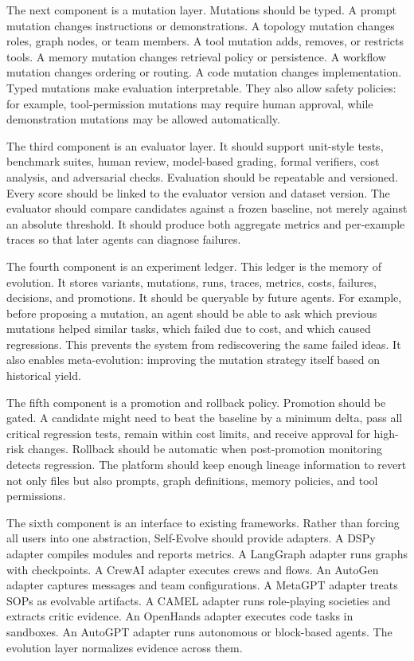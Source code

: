 The next component is a mutation layer.  Mutations should be typed.  A prompt mutation changes instructions or demonstrations.  A topology mutation changes roles, graph nodes, or team members.  A tool mutation adds, removes, or restricts tools.  A memory mutation changes retrieval policy or persistence.  A workflow mutation changes ordering or routing.  A code mutation changes implementation.  Typed mutations make evaluation interpretable.  They also allow safety policies: for example, tool-permission mutations may require human approval, while demonstration mutations may be allowed automatically.

The third component is an evaluator layer.  It should support unit-style tests, benchmark suites, human review, model-based grading, formal verifiers, cost analysis, and adversarial checks.  Evaluation should be repeatable and versioned.  Every score should be linked to the evaluator version and dataset version.  The evaluator should compare candidates against a frozen baseline, not merely against an absolute threshold.  It should produce both aggregate metrics and per-example traces so that later agents can diagnose failures.

The fourth component is an experiment ledger.  This ledger is the memory of evolution.  It stores variants, mutations, runs, traces, metrics, costs, failures, decisions, and promotions.  It should be queryable by future agents.  For example, before proposing a mutation, an agent should be able to ask which previous mutations helped similar tasks, which failed due to cost, and which caused regressions.  This prevents the system from rediscovering the same failed ideas.  It also enables meta-evolution: improving the mutation strategy itself based on historical yield.

The fifth component is a promotion and rollback policy.  Promotion should be gated.  A candidate might need to beat the baseline by a minimum delta, pass all critical regression tests, remain within cost limits, and receive approval for high-risk changes.  Rollback should be automatic when post-promotion monitoring detects regression.  The platform should keep enough lineage information to revert not only files but also prompts, graph definitions, memory policies, and tool permissions.

The sixth component is an interface to existing frameworks.  Rather than forcing all users into one abstraction, Self-Evolve should provide adapters.  A DSPy adapter compiles modules and reports metrics.  A LangGraph adapter runs graphs with checkpoints.  A CrewAI adapter executes crews and flows.  An AutoGen adapter captures messages and team configurations.  A MetaGPT adapter treats SOPs as evolvable artifacts.  A CAMEL adapter runs role-playing societies and extracts critic evidence.  An OpenHands adapter executes code tasks in sandboxes.  An AutoGPT adapter runs autonomous or block-based agents.  The evolution layer normalizes evidence across them.

